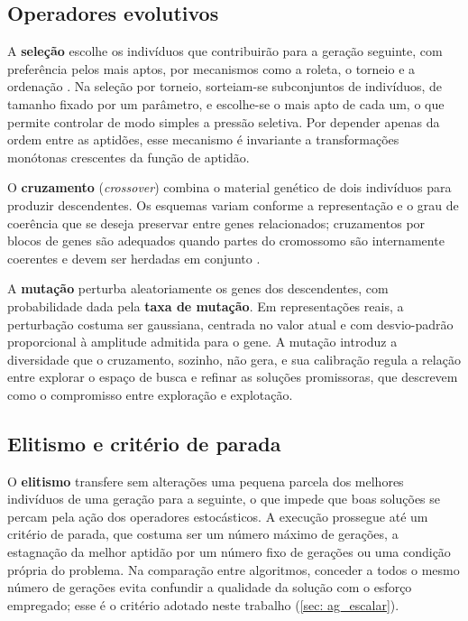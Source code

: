 \subsection{Operadores evolutivos}

A \textbf{seleção} escolhe os indivíduos que contribuirão para a geração seguinte, com preferência pelos mais aptos, por mecanismos como a roleta, o torneio e a ordenação \cite{eiben2015introduction}. Na seleção por torneio, sorteiam-se subconjuntos de indivíduos, de tamanho fixado por um parâmetro, e escolhe-se o mais apto de cada um, o que permite controlar de modo simples a pressão seletiva. Por depender apenas da ordem entre as aptidões, esse mecanismo é invariante a transformações monótonas crescentes da função de aptidão.

O \textbf{cruzamento} (\textit{crossover}) combina o material genético de dois indivíduos para produzir descendentes. Os esquemas variam conforme a representação e o grau de coerência que se deseja preservar entre genes relacionados; cruzamentos por blocos de genes são adequados quando partes do cromossomo são internamente coerentes e devem ser herdadas em conjunto \cite{mitchell1998introduction}.

A \textbf{mutação} perturba aleatoriamente os genes dos descendentes, com probabilidade dada pela \textbf{taxa de mutação}. Em representações reais, a perturbação costuma ser gaussiana, centrada no valor atual e com desvio-padrão proporcional à amplitude admitida para o gene. A mutação introduz a diversidade que o cruzamento, sozinho, não gera, e sua calibração regula a relação entre explorar o espaço de busca e refinar as soluções promissoras, que  descrevem como o compromisso entre exploração e explotação.

\subsection{Elitismo e critério de parada}

O \textbf{elitismo} transfere sem alterações uma pequena parcela dos melhores indivíduos de uma geração para a seguinte, o que impede que boas soluções se percam pela ação dos operadores estocásticos. A execução prossegue até um critério de parada, que costuma ser um número máximo de gerações, a estagnação da melhor aptidão por um número fixo de gerações ou uma condição própria do problema. Na comparação entre algoritmos, conceder a todos o mesmo número de gerações evita confundir a qualidade da solução com o esforço empregado; esse é o critério adotado neste trabalho (\autoref{sec: ag_escalar}).

